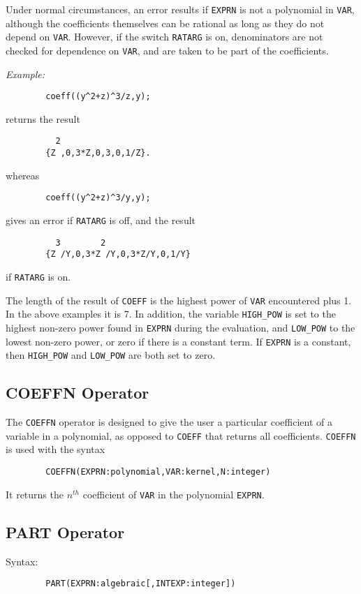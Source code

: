 Under normal circumstances, an error results if {\tt EXPRN} is not a
polynomial in {\tt VAR}, although the coefficients themselves can be
rational as long as they do not depend on {\tt VAR}.  However, if the
switch {\tt RATARG} is on, denominators are not checked for
dependence on {\tt VAR}, and are taken to be part of the coefficients.

{\it Example:}
\begin{verbatim}
        coeff((y^2+z)^3/z,y);
\end{verbatim}
returns the result
\begin{verbatim}
          2
        {Z ,0,3*Z,0,3,0,1/Z}.
\end{verbatim}
whereas
\begin{verbatim}
        coeff((y^2+z)^3/y,y);
\end{verbatim}
gives an error if {\tt RATARG} is off, and the result
\begin{verbatim}
          3        2
        {Z /Y,0,3*Z /Y,0,3*Z/Y,0,1/Y}
\end{verbatim}
if {\tt RATARG} is on.

The length of the result of {\tt COEFF} is the highest power of {\tt VAR}
encountered plus 1.  In the above examples it is 7.  In addition, the
variable {\tt HIGH\_POW} is set to the highest non-zero
power found in {\tt EXPRN} during the evaluation, and {\tt LOW\_POW}
 to the lowest non-zero power, or zero if there is a
constant term.  If {\tt EXPRN} is a constant, then {\tt HIGH\_POW} and
{\tt LOW\_POW} are both set to zero.

\subsection{COEFFN Operator}

The {\tt COEFFN} operator is designed to give the user a particular
coefficient of a variable in a polynomial, as opposed to {\tt COEFF} that
returns all coefficients. {\tt COEFFN} is used with the syntax
\begin{verbatim}
        COEFFN(EXPRN:polynomial,VAR:kernel,N:integer)
\end{verbatim}
It returns the $n^{th}$ coefficient of {\tt VAR} in the polynomial
{\tt EXPRN}.

\subsection{PART Operator}
Syntax:
\begin{verbatim}
        PART(EXPRN:algebraic[,INTEXP:integer])
\end{verbatim}

